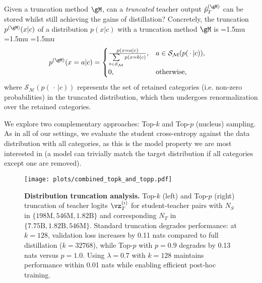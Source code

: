Given a truncation method $\gM$, can a \emph{truncated} teacher output $\hat p_T^{(\gM)}$
can be stored whilst still achieving the gains of distillation? 
Concretely, the truncation $p^{(\gM)}(x|c)$ of a distribution $p(x|c)$
with a truncation method $\gM$ is
{
		\medmuskip=1.5mu
		\thinmuskip=1.5mu
		\thickmuskip=1.5mu
\begin{align}\label{eq:truncation}
    p^{(\gM)}(x=a|c)
    &= \begin{cases}
        \frac{p(x=a|c)}
        {\sum\limits_{b\in \mathcal{S}_\mathcal{M}}
             p(x=b|c)},
         & a \in \mathcal{S}_\mathcal{M}(p(\,\cdot\,|c)), \\[6pt]
        0,
         & \text{otherwise},
    \end{cases}
\end{align}
}where $\mathcal{S}_\mathcal{M}(p(\,\cdot\,|c))$ represents the set of retained categories (i.e. non-zero probabilities)
in the truncated distribution,
which then undergoes renormalization over the retained categories.

We explore two complementary approaches: Top-$k$ and Top-$p$ (nucleus) sampling.
As in all of our settings, we evaluate the student cross-entropy against the data distribution with all categories, as this is the model property we are most interested in (a model can trivially match the target distribution if all categories except one are removed).
\begin{figure}[h]
	\centering
        \vspace{-0.12cm}
        \texttt{[image: plots/combined\_topk\_and\_topp.pdf]}
        \vspace{-0.12cm}
        \caption{\textbf{Distribution truncation analysis.} Top-$k$ (left) and Top-$p$ (right) truncation of teacher logits $\vz_T^{(i)}$ for student-teacher pairs with $N_S$ in $\{198\text{M},546\text{M},1.82\text{B}\}$ and corresponding $N_T$ in $\{7.75\text{B},1.82\text{B},546\text{M}\}$. Standard truncation degrades performance: at $k=128$, validation loss increases by 0.11 nats compared to full distillation ($k=32768$), while Top-$p$ with $p=0.9$ degrades by 0.13 nats versus $p=1.0$. Using $\lambda=0.7$ with $k=128$ maintains performance within 0.01 nats while enabling efficient post-hoc training.}
        \vspace{-0.12cm}
	\label{fig:top-k-and-top-p}
\end{figure}

